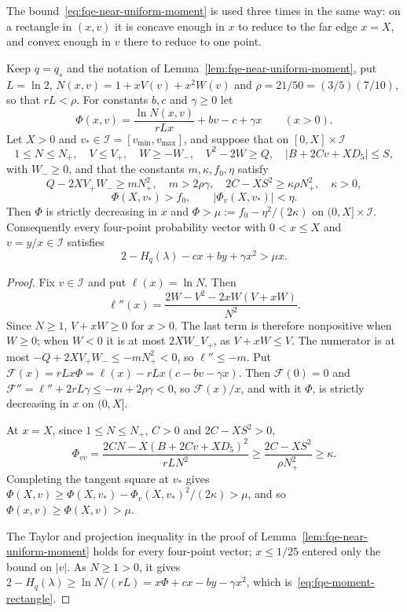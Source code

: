 The bound~\eqref{eq:fqe-near-uniform-moment} is used three times in the same way: on a rectangle
in $(x,v)$ it is concave enough in $x$ to reduce to the far edge $x=X$, and convex enough in $v$ there
to reduce to one point.
\begin{lemma}
\label{lem:fqe-moment-rectangle}
Keep $q=q_s$ and the notation of Lemma~\ref{lem:fqe-near-uniform-moment}, put $L=\ln2$,
$N(x,v)=1+xV(v)+x^2W(v)$ and $\rho=21/50=(3/5)(7/10)$, so that $rL<\rho$. For constants $b,c$ and
$\gamma\ge0$ let
\[
\Phi(x,v)=\frac{\ln N(x,v)}{rLx}+bv-c+\gamma x\qquad(x>0).
\]
Let $X>0$ and $v_*\in\mathcal I=[v_{\min},v_{\max}]$, and suppose that on $[0,X]\times\mathcal I$
\[
1\le N\le N_+,\quad V\le V_+,\quad W\ge-W_-,\quad V^2-2W\ge Q,\quad
|B+2Cv+XD_5|\le S,
\tag{MR1}\label{eq:fqe-rect-bounds}
\]
with $W_-\ge0$, and that the constants $m,\kappa,f_0,\eta$ satisfy
\[
Q-2XV_+W_-\ge mN_+^2,\quad m>2\rho\gamma,\quad
2C-XS^2\ge\kappa\rho N_+^2,\quad \kappa>0,
\tag{MR2}\label{eq:fqe-rect-curvature}
\]
\[
\Phi(X,v_*)>f_0,\qquad|\Phi_v(X,v_*)|<\eta.
\tag{MR3}\label{eq:fqe-rect-point}
\]
Then $\Phi$ is strictly decreasing in $x$ and $\Phi>\mu:=f_0-\eta^2/(2\kappa)$ on
$(0,X]\times\mathcal I$. Consequently every four-point probability vector with $0<x\le X$ and
$v=y/x\in\mathcal I$ satisfies
\[
2-H_q(\lambda)-cx+by+\gamma x^2>\mu x.
\tag{MR}\label{eq:fqe-moment-rectangle}
\]
\end{lemma}
\begin{proof}
Fix $v\in\mathcal I$ and put $\ell(x)=\ln N$. Then
\[
\ell''(x)=\frac{2W-V^2-2xW(V+xW)}{N^2}.
\]
Since $N\ge1$, $V+xW\ge0$ for $x>0$. The last term is therefore nonpositive when $W\ge0$; when $W<0$ it is
at most $2XW_-V_+$, as $V+xW\le V$. The numerator is at most $-Q+2XV_+W_-\le-mN_+^2<0$, so
$\ell''\le-m$. Put $\mathcal F(x)=rLx\Phi=\ell(x)-rLx(c-bv-\gamma x)$. Then $\mathcal F(0)=0$ and
$\mathcal F''=\ell''+2rL\gamma\le-m+2\rho\gamma<0$, so $\mathcal F(x)/x$, and with it $\Phi$, is strictly
decreasing in $x$ on $(0,X]$.

At $x=X$, since $1\le N\le N_+$, $C>0$ and $2C-XS^2>0$,
\[
\Phi_{vv}=\frac{2CN-X(B+2Cv+XD_5)^2}{rLN^2}\ge\frac{2C-XS^2}{\rho N_+^2}\ge\kappa .
\]
Completing the tangent square at $v_*$ gives
$\Phi(X,v)\ge\Phi(X,v_*)-\Phi_v(X,v_*)^2/(2\kappa)>\mu$, and so $\Phi(x,v)\ge\Phi(X,v)>\mu$.

The Taylor and projection inequality in the proof of Lemma~\ref{lem:fqe-near-uniform-moment} holds for
every four-point vector; $x\le1/25$ entered only the bound on $|v|$. As $N\ge1>0$, it gives
$2-H_q(\lambda)\ge\ln N/(rL)=x\Phi+cx-by-\gamma x^2$, which is~\eqref{eq:fqe-moment-rectangle}.
\end{proof}

